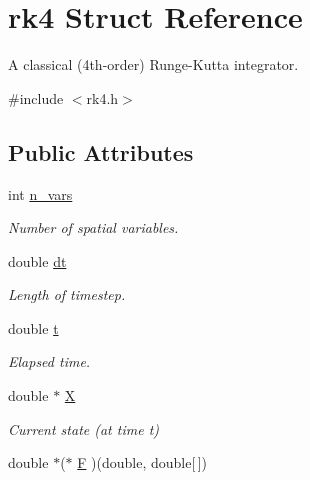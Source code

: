 \hypertarget{structrk4}{}\section{rk4 Struct Reference}
\label{structrk4}


A classical (4th-\/order) Runge-\/\+Kutta integrator.  




{\ttfamily \#include $<$rk4.\+h$>$}

\subsection*{Public Attributes}
\begin{DoxyCompactItemize}
\item 
\hypertarget{structrk4_a1771335b8075b6c2bc2f7f365ece307b}{}int \hyperlink{structrk4_a1771335b8075b6c2bc2f7f365ece307b}{n\+\_\+vars}\label{structrk4_a1771335b8075b6c2bc2f7f365ece307b}

\begin{DoxyCompactList}\small\item\em Number of spatial variables. \end{DoxyCompactList}\item 
\hypertarget{structrk4_a79622109dfc5eecf546f51828768d70e}{}double \hyperlink{structrk4_a79622109dfc5eecf546f51828768d70e}{dt}\label{structrk4_a79622109dfc5eecf546f51828768d70e}

\begin{DoxyCompactList}\small\item\em Length of timestep. \end{DoxyCompactList}\item 
\hypertarget{structrk4_ab1179e509c8df420d8d9f89af1a842d3}{}double \hyperlink{structrk4_ab1179e509c8df420d8d9f89af1a842d3}{t}\label{structrk4_ab1179e509c8df420d8d9f89af1a842d3}

\begin{DoxyCompactList}\small\item\em Elapsed time. \end{DoxyCompactList}\item 
\hypertarget{structrk4_acdd11c2d23e608d1a5b59b001c29e3fe}{}double $\ast$ \hyperlink{structrk4_acdd11c2d23e608d1a5b59b001c29e3fe}{X}\label{structrk4_acdd11c2d23e608d1a5b59b001c29e3fe}

\begin{DoxyCompactList}\small\item\em Current state (at time t) \end{DoxyCompactList}\item 
\hypertarget{structrk4_ad7511057d017bdbfb4749504a81a791c}{}double $\ast$($\ast$ \hyperlink{structrk4_ad7511057d017bdbfb4749504a81a791c}{F} )(double, double\mbox{[}$\,$\mbox{]})\label{structrk4_ad7511057d017bdbfb4749504a81a791c}


\end{DoxyCompactItemize}
